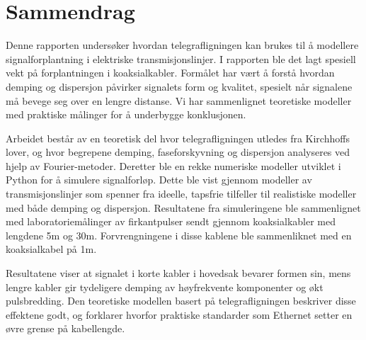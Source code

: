 \section*{Sammendrag}
Denne rapporten undersøker hvordan telegrafligningen kan brukes til å modellere signalforplantning i elektriske transmisjonslinjer. I rapporten ble det lagt spesiell vekt på forplantningen i koaksialkabler. Formålet har vært å forstå hvordan demping og dispersjon påvirker signalets form og kvalitet, spesielt når signalene må bevege seg over en lengre distanse. Vi har sammenlignet teoretiske modeller med praktiske målinger for å underbygge konklusjonen. 

Arbeidet består av en teoretisk del hvor telegrafligningen utledes fra Kirchhoffs lover, og hvor begrepene demping, faseforskyvning og dispersjon analyseres ved hjelp av Fourier-metoder. Deretter ble en rekke numeriske modeller utviklet i Python for å simulere signalforløp. Dette ble vist gjennom modeller av transmisjonslinjer som spenner fra ideelle, tapsfrie tilfeller til realistiske modeller med både demping og dispersjon. Resultatene fra simuleringene ble sammenlignet med laboratoriemålinger av firkantpulser sendt gjennom koaksialkabler med lengdene 5m og 30m. Forvrengningene i disse kablene ble sammenliknet med en koaksialkabel på 1m.

Resultatene viser at signalet i korte kabler i hovedsak bevarer formen sin, mens lengre kabler gir tydeligere demping av høyfrekvente komponenter og økt pulsbredding. Den teoretiske modellen basert på telegrafligningen beskriver disse effektene godt, og forklarer hvorfor praktiske standarder som Ethernet setter en øvre grense på kabellengde.


